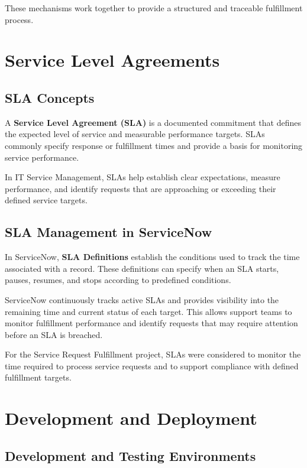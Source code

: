 \documentclass[12pt,a4paper]{report}
\begin{document}
These mechanisms work together to provide a structured and traceable
fulfillment process.


\section{Service Level Agreements}

\subsection{SLA Concepts}

A \textbf{Service Level Agreement (SLA)} is a documented commitment that
defines the expected level of service and measurable performance targets.
SLAs commonly specify response or fulfillment times and provide a basis for
monitoring service performance.

In IT Service Management, SLAs help establish clear expectations, measure
performance, and identify requests that are approaching or exceeding their
defined service targets.

\subsection{SLA Management in ServiceNow}

In ServiceNow, \textbf{SLA Definitions} establish the conditions used to
track the time associated with a record. These definitions can specify when
an SLA starts, pauses, resumes, and stops according to predefined conditions.

ServiceNow continuously tracks active SLAs and provides visibility into the
remaining time and current status of each target. This allows support teams
to monitor fulfillment performance and identify requests that may require
attention before an SLA is breached.

For the Service Request Fulfillment project, SLAs were considered to monitor
the time required to process service requests and to support compliance with
defined fulfillment targets.


\section{Development and Deployment}

\subsection{Development and Testing Environments}
\end{document}
